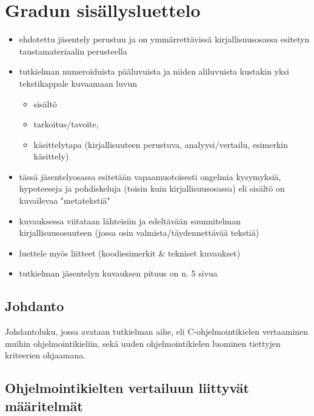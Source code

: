 \section{Gradun sisällysluettelo}

\begin{itemize}
    \item ehdotettu jäsentely perustuu ja on ymmärrettävissä kirjallisuusosassa esitetyn
taustamateriaalin perusteella

    \item tutkielman numeroiduista pääluvuista ja niiden aliluvuista kustakin
        yksi tekstikappale kuvaamaan luvun

        \begin{itemize}
            \item sisältö
            \item tarkoitus/tavoite,
            \item käsittelytapa (kirjallisuuteen perustuva, analyysi/vertailu,
                esimerkin käsittely)
        \end{itemize}


    \item tässä jäsentelyosassa esitetään vapaamuotoisesti ongelmia kysymyksiä,
        hypoteeseja ja pohdiskeluja (toisin kuin kirjallisuusosassa)  eli sisältö
        on kuvailevaa "metatekstiä"

    \item kuvauksessa viitataan lähteisiin ja edeltävään suunnitelman
        kirjallisuusosuuteen (jossa osin valmista/täydennettävää tekstiä)

    \item luettele myös liitteet (koodiesimerkit \& tekniset kuvaukset)

    \item tutkielman jäsentelyn kuvauksen pituus on n. 5 sivua

\end{itemize}

\subsection{Johdanto}

Johdantoluku, jossa avataan tutkielman aihe, eli C-ohjelmointikielen
vertaaminen muihin ohjelmointikieliin, sekä uuden ohjelmointikielen luominen
tiettyjen kriteerien ohjaamana.

\subsection{Ohjelmointikielten vertailuun liittyvät määritelmät}

